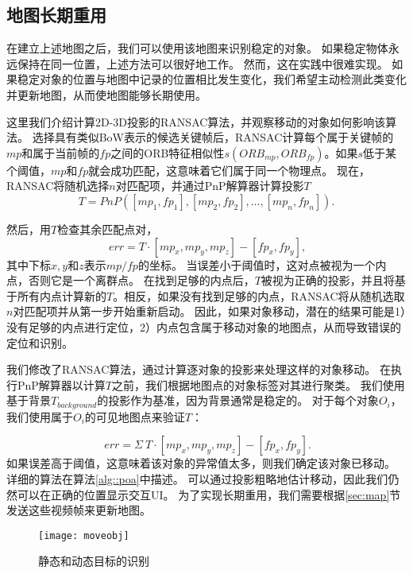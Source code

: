 \subsection{地图长期重用}
在建立上述地图之后，我们可以使用该地图来识别稳定的对象。
如果稳定物体永远保持在同一位置，上述方法可以很好地工作。
然而，这在实践中很难实现。
如果稳定对象的位置与地图中记录的位置相比发生变化，我们希望主动检测此类变化并更新地图，从而使地图能够长期使用。

这里我们介绍计算2D-3D投影的RANSAC\cite{derpanis2010overview}算法，并观察移动的对象如何影响该算法。
选择具有类似BoW表示的候选关键帧后，RANSAC计算每个属于关键帧的$mp$和属于当前帧的$fp$之间的ORB特征相似性$s(ORB_{mp}, ORB_{fp})$。如果$s$低于某个阈值，$mp$和$fp$就会成功匹配，这意味着它们属于同一个物理点。
现在，RANSAC将随机选择$n$对匹配项，并通过PnP解算器计算投影$T$
\begin{equation}\label{equ:pnp}
    T = PnP([mp_1, fp_1],[mp_2, fp_2], ..., [mp_n, fp_n]).
\end{equation} 

然后，用$T$检查其余匹配点对，
\begin{equation}\label{equ:check}
    \
    err = T \cdot [mp_x, mp_y, mp_z] - [fp_x, fp_y],
\end{equation} 
其中下标$x,y$和$z$表示$mp/fp$的坐标。
当误差小于阈值时，这对点被视为一个内点，否则它是一个离群点。
在找到足够的内点后，$T$被视为正确的投影，并且将基于所有内点计算新的$T$。相反，如果没有找到足够的内点，RANSAC将从随机选取$n$对匹配项并从第一步开始重新启动。
因此，如果对象移动，潜在的结果可能是1）没有足够的内点进行定位，2）内点包含属于移动对象的地图点，从而导致错误的定位和识别。

我们修改了RANSAC算法，通过计算逐对象的投影来处理这样的对象移动。
在执行PnP解算器以计算$T$之前，我们根据地图点的对象标签对其进行聚类。
我们使用基于背景$T_{background}$的投影作为基准，因为背景通常是稳定的。
对于每个对象$O_i$，我们使用属于$O_i$的可见地图点来验证$T$：

\begin{equation}\label{equ:gdt}
\
err = \Sigma \ T \cdot [mp_x, mp_y, mp_z] - [fp_x, fp_y].
\end{equation}
如果误差高于阈值，这意味着该对象的异常值太多，则我们确定该对象已移动。
详细的算法在算法\ref{alg::poa}中描述。
可以通过投影粗略地估计移动，因此我们仍然可以在正确的位置显示交互UI。
为了实现长期重用，我们需要根据\ref{sec:map}节发送这些视频帧来更新地图。

\begin{figure}[htbp]
	\centering
	\texttt{[image: moveobj]}
	\caption{静态和动态目标的识别}
	\label{fig:move}
\end{figure}

